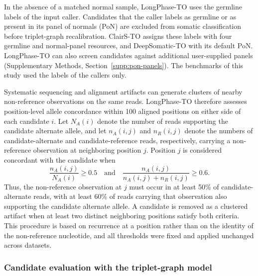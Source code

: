 \documentclass[unnumsec,webpdf,contemporary,large]{oup-authoring-template}
\begin{document}
In the absence of a matched normal sample, LongPhase-TO uses the germline labels of the input caller. Candidates that the caller labels as germline or as present in its panel of normals (PoN) are excluded from somatic classification before triplet-graph recalibration. ClairS-TO assigns these labels with four germline and normal-panel resources, and DeepSomatic-TO with its default PoN. LongPhase-TO can also screen candidates against additional user-supplied panels (Supplementary Methods, Section~\ref{supp:pon-panels}). The benchmarks of this study used the labels of the callers only.

Systematic sequencing and alignment artifacts can generate clusters of nearby non-reference observations on the same reads. LongPhase-TO therefore assesses position-level allele concordance within 100 aligned positions on either side of each candidate \(i\). Let \(N_A(i)\) denote the number of reads supporting the candidate alternate allele, and let \(n_A(i,j)\) and \(n_R(i,j)\) denote the numbers of candidate-alternate and candidate-reference reads, respectively, carrying a non-reference observation at neighboring position \(j\). Position \(j\) is considered concordant with the candidate when
\[
\frac{n_A(i,j)}{N_A(i)}\geq0.5
\quad\text{and}\quad
\frac{n_A(i,j)}{n_A(i,j)+n_R(i,j)}\geq0.6.
\]
Thus, the non-reference observation at \(j\) must occur in at least 50\% of candidate-alternate reads, with at least 60\% of reads carrying that observation also supporting the candidate alternate allele. A candidate is removed as a clustered artifact when at least two distinct neighboring positions satisfy both criteria. This procedure is based on recurrence at a position rather than on the identity of the non-reference nucleotide, and all thresholds were fixed and applied unchanged across datasets.

\subsubsection{Candidate evaluation with the triplet-graph model}
\end{document}
